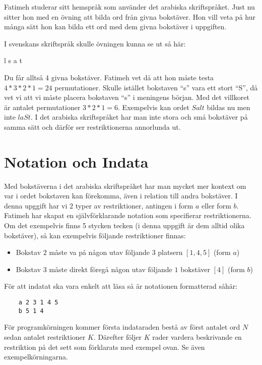 
Fatimeh studerar sitt hemspråk som använder det arabiska skriftspråket. Just nu
sitter hon med en övning att bilda ord från givna bokstäver. Hon vill veta på
hur många sätt hon kan bilda ett ord med dem givna bokstäver i uppgiften.

I svenskans skriftspråk skulle övningen kunna se ut så här:

\vspace{0.2in}
\centerline{l s a t}
\vspace{0.2in}

Du får alltså 4 givna bokstäver. Fatimeh vet då att hon måste testa $4*3*2*1 =
24$ permutationer. Skulle istället bokstaven ``s'' vara ett stort ``S'', då vet vi
att vi måste placera bokstaven ``s'' i meningens början. Med det villkoret är
antalet permutationer $3*2*1 = 6$.  Exempelvis kan ordet $Salt$ bildas nu men
inte $laSt$. I det arabiska skriftspråket har man inte stora och små bokstäver
på samma sätt och därför ser restriktionerna annorlunda ut.

\section*{Notation och Indata}

Med bokstäverna i det arabiska skriftspråket har man mycket mer kontext om var
i ordet bokstaven kan förekomma, även i relation till andra bokstäver.  I denna
upggift har vi $2$ typer av restriktioner, antingen i form $a$ eller form $b$. Fatimeh har skapat en
självförklarande notation som specifierar restriktionerna. Om det exempelvis
finns 5 stycken tecken (i denna uppgift är dem alltid olika bokstäver), så kan
exempelvis följande restriktioner finnas:

\begin{itemize}
    \item Bokstav $2$ måste va på någon utav följande $3$ platsern $[1, 4, 5]$ (form $a$)
    \item Bokstav $3$ måste direkt föregå någon utav följande $1$ bokstäver $[4]$ (form $b$)
\end{itemize}

För att indatat ska vara enkelt att läsa så är notationen formatterad såhär:

\begin{lstlisting}
    a 2 3 1 4 5
    b 5 1 4
\end{lstlisting}

För programkörningen kommer första indataraden bestå av först antalet ord $N$
sedan antalet restriktioner $K$. Därefter följer $K$ rader vardera beskrivande
en restriktion på det sett som förklarats med exempel ovan. Se även
exempelkörningarna.

